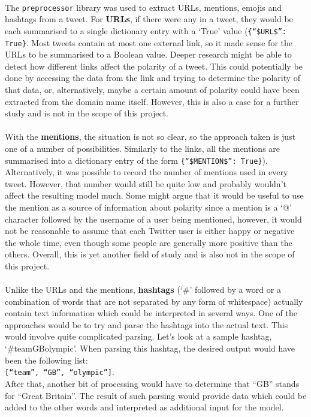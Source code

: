 \paragraph{}
The \texttt{preprocessor} library was used to extract URLs, mentions, emojis and hashtags from a tweet. For \textbf{URLs}, if there were any in a tweet, they would be each summarised to a single dictionary entry with a `True' value (\texttt{\{``\$URL\$'': True\}}. Most tweets contain at most one external link, so it made sense for the URLs to be summarised to a Boolean value. Deeper research might be able to detect how different links affect the polarity of a tweet. This could potentially be done by accessing the data from the link and trying to determine the polarity of that data, or, alternatively, maybe a certain amount of polarity could have been extracted from the domain name itself. However, this is also a case for a further study and is not in the scope of this project. 
\paragraph{}
With the \textbf{mentions}, the situation is not so clear, so the approach taken is just one of a number of possibilities. Similarly to the links, all the mentions are summarised into a dictionary entry of the form \texttt{\{``\$MENTION\$'': True\}}). Alternatively, it was possible to record the number of mentions used in every tweet. However, that number would still be quite low and probably wouldn't affect the resulting model much. Some might argue that it would be useful to use the mention as a source of information about polarity since a mention is a `@' character followed by the username of a user being mentioned, however, it would not be reasonable to assume that each Twitter user is either happy or negative the whole time, even though some people are generally more positive than the others. Overall, this is yet another field of study and is also not in the scope of this project.
\paragraph{}
Unlike the URLs and the mentions, \textbf{hashtags} (`\#' followed by a word or a combination of words that are not separated by any form of whitespace) actually contain text information which could be interpreted in several ways. One of the approaches would be to try and parse the hashtags into the actual text. This would involve quite complicated parsing. Let's look at a sample hashtag, `\#teamGBolympic'. When parsing this hashtag, the desired output would have been the following list: \\ \texttt{[``team'', ``GB'', ``olympic'']}.\\ After that, another bit of processing would have to determine that ``GB'' stands for ``Great Britain''. The result of such parsing would provide data which could be added to the other words and interpreted as additional input for the model. 

